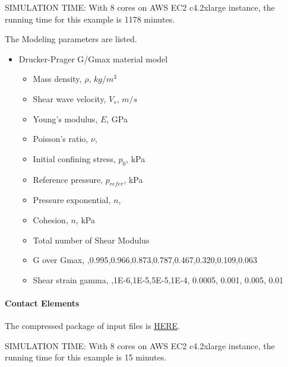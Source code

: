 SIMULATION TIME: With 8 cores on AWS EC2 c4.2xlarge instance, the running time for this example is 1178 minutes.

The Modeling parameters are listed.
\begin{itemize}
  \item Drucker-Prager G/Gmax material model 
  \begin{itemize}
    \item Mass density, $\rho$, \enspace {} $kg/m^3$
    \item Shear wave velocity, $V_s$, \enspace {} $m/s$
    \item Young's modulus, $E$, \enspace {} GPa
    \item Poisson's ratio, $\nu$, \enspace {}
    \item Initial confining stress, $p_0$, \enspace {} kPa
    \item Reference pressure, $p_{refer} $, \enspace {} kPa
    \item Pressure exponential, $ n  $, \enspace {}
    \item Cohesion, $ n  $, \enspace {} kPa
    \item Total number of Shear Modulus \enspace {}
    \item G over Gmax, \enspace {},0.995,0.966,0.873,0.787,0.467,0.320,0.109,0.063
    \item Shear strain gamma, \enspace {},1E-6,1E-5,5E-5,1E-4, 0.0005, 0.001, 0.005, 0.01
  \end{itemize}
\end{itemize}


\paragraph{Contact Elements}
The compressed package of input files is  
\href{http://sokocalo.engr.ucdavis.edu/~jeremic/lecture_notes_online_material/_Chapter_Short_Course_Examples/nonlinear_analysis_steps/soil-structure/contact/_all_files_packaged_for_contact.tar.gz}{HERE}. 

SIMULATION TIME: With 8 cores on AWS EC2 c4.2xlarge instance, the running time for this example is 15 minutes.

